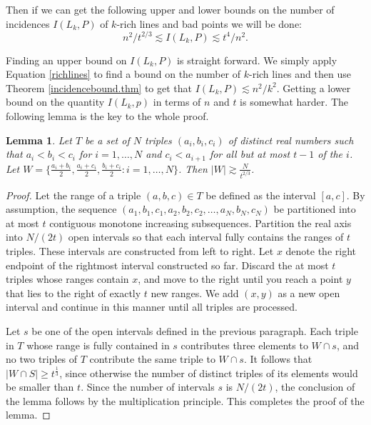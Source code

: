 \documentclass[]{amsart}
\numberwithin{equation}{section}
\theoremstyle{plain}
\newtheorem{lemma}[theorem]{Lemma}
\theoremstyle{definition}
\theoremstyle{remark}
\begin{document}
Then if we can get the following upper and lower bounds on the number of
incidences $I(L_k, P)$ of $k$-rich lines and bad points we will be done:
\begin{equation}
n^2/t^{2/3} \lesssim I(L_k, P) \lesssim t^4/n^2.
\end{equation}

Finding an upper bound on $I(L_k, P)$ is straight forward.  We
simply apply Equation \ref{richlines} to find a bound on the
number of $k$-rich lines and then use Theorem
\ref{incidencebound.thm} to get that $I(L_k, P) \lesssim n^2/k^2$.
Getting a lower bound on the quantity $I(L_k, p)$ in terms of $n$
and $t$ is somewhat harder.  The following lemma is the key to the
whole proof.

\begin{lemma} \label{lin.lem}
Let $T$ be a set of $N$ triples $(a_i,b_i,c_i)$ of distinct real
numbers such that $a_i<b_i<c_i$ for $i=1, \ldots, N$ and
$c_i<a_{i+1}$ for all but at most $t-1$ of the $i$.  Let $W= \{
\frac{a_i+b_i}{2}, \frac{a_i+c_i}{2},\frac{b_i+c_i}{2}: i=1,
\ldots, N \}$.  Then $|W| \gtrsim \frac{N}{t^{2/3}}$.
\end{lemma}

\begin{proof} Let the range of a triple $(a,b,c) \in T$ be defined
as the interval $[a,c]$. By assumption, the sequence
$(a_1,b_1,c_1,a_2,b_2,c_2, \dots, a_N,b_N,c_N)$ be partitioned
into at most $t$ contiguous monotone increasing subsequences.
Partition the real axis into $N/(2t)$ open intervals so that each
interval fully contains the ranges of $t$ triples. These intervals
are constructed from left to right. Let $x$ denote the right
endpoint of the rightmost interval constructed so far. Discard the
at most $t$ triples whose ranges contain $x$, and move to the
right until you reach a point $y$ that lies to the right of
exactly $t$ new ranges. We add $(x,y)$ as a new open interval and
continue in this manner until all triples are processed.

Let $s$ be one of the open intervals defined in the previous
paragraph. Each triple in $T$ whose range is fully contained in
$s$ contributes three elements to $W \cap s$, and no two triples
of $T$ contribute the same triple to $W \cap s$. It follows that
$|W \cap S| \ge t^{\frac{1}{3}}$, since otherwise the number of
distinct triples of its elements would be smaller than $t$. Since
the number of intervals $s$ is $N/(2t)$, the conclusion of the
lemma follows by the multiplication principle. This completes the
proof of the lemma. \end{proof}
\end{document}
